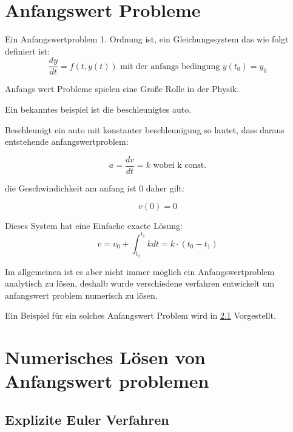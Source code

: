 
\section{Anfangswert Probleme}




Ein Anfangswertproblem 1. Ordnung ist, ein Gleichungssystem das wie folgt definiert ist:
$$
\frac{dy}{dt} = f(t, y(t)) \text{ mit der anfangs bedingung } y(t_0) = y_0
$$

Anfangs wert Probleme spielen eine Große Rolle in der Physik.

Ein bekanntes beispiel ist die beschleunigtes auto.

Beschleunigt ein auto mit konstanter beschleunigung so lautet, dass daraus entstehende anfangswertproblem:


$$
a = \frac{dv}{dt} = k \text{ wobei k const.}
$$

die Geschwindichkeit am anfang ist 0 daher gilt:

$$
v(0) = 0
$$

Dieses System hat eine Einfache exacte Lösung:
$$
v = v_0 + \int_{t_0}^{t_1} k dt = k \cdot (t_0 - t_1) 
$$

Im allgemeinen ist es aber nicht immer möglich ein Anfangswertproblem analytisch zu lösen, deshalb wurde verschiedene  verfahren entwickelt um anfangswert problem numerisch zu lösen.

Ein Beispiel für ein solches Anfangswert Problem wird in \ref{} Vorgestellt.


\section{Numerisches Lösen von Anfangswert problemen}

\subsection{Explizite Euler Verfahren}


